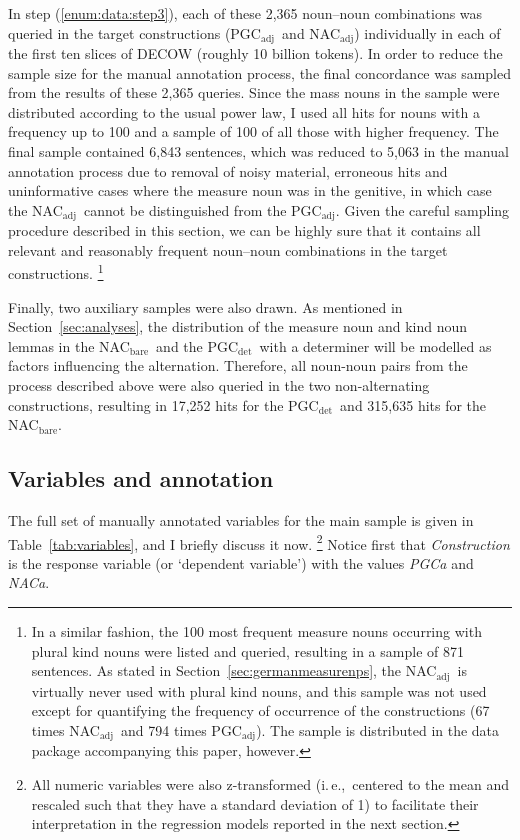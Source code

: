 \documentclass[USenglish]{article}
\newcommand{\ie}{i.\,e.,}
\newcommand{\Sub}[1]{\ensuremath{\mathrm{_{#1}}}}
\newcommand{\NACb}{NAC\Sub{bare}}
\newcommand{\NACa}{NAC\Sub{adj}}
\newcommand{\PGCd}{PGC\Sub{det}}
\newcommand{\PGCa}{PGC\Sub{adj}}
\begin{document}
In step (\ref{enum:data:step3}), each of these 2,365 noun–noun combinations was queried in the target constructions (\PGCa\ and \NACa) individually in each of the first ten slices of DECOW (roughly 10 billion tokens).
In order to reduce the sample size for the manual annotation process, the final concordance was sampled from the results of these 2,365 queries.
Since the mass nouns in the sample were distributed according to the usual power law, I used all hits for nouns with a frequency up to 100 and a sample of 100 of all those with higher frequency.
The final sample contained 6,843 sentences, which was reduced to 5,063 in the manual annotation process due to removal of noisy material, erroneous hits and uninformative cases where the measure noun was in the genitive, in which case the \NACa\ cannot be distinguished from the \PGCa.
Given the careful sampling procedure described in this section, we can be highly sure that it contains all relevant and reasonably frequent noun–noun combinations in the target constructions.%
\footnote{In a similar fashion, the 100 most frequent measure nouns occurring with plural kind nouns were listed and queried, resulting in a sample of 871 sentences.
As stated in Section~\ref{sec:germanmeasurenps}, the \NACa\ is virtually never used with plural kind nouns, and this sample was not used except for quantifying the frequency of occurrence of the constructions (67 times \NACa\ and 794 times \PGCa).
The sample is distributed in the data package accompanying this paper, however.
}

Finally, two auxiliary samples were also drawn.
As mentioned in Section~\ref{sec:analyses}, the distribution of the measure noun and kind noun lemmas in the \NACb\ and the \PGCd\ with a determiner will be modelled as factors influencing the alternation.
Therefore, all noun-noun pairs from the process described above were also queried in the two non-alternating constructions, resulting in 17,252 hits for the \PGCd\ and 315,635 hits for the \NACb.



\subsection{Variables and annotation}
\label{sec:annotation}

The full set of manually annotated variables for the main sample is given in Table~\ref{tab:variables}, and I briefly discuss it now.%
\footnote{All numeric variables were also z-transformed (\ie\ centered to the mean and rescaled such that they have a standard deviation of 1) to facilitate their interpretation in the regression models reported in the next section.}
Notice first that \textit{Construction} is the response variable (or `dependent variable') with the values \textit{PGCa} and \textit{NACa}.
\end{document}
